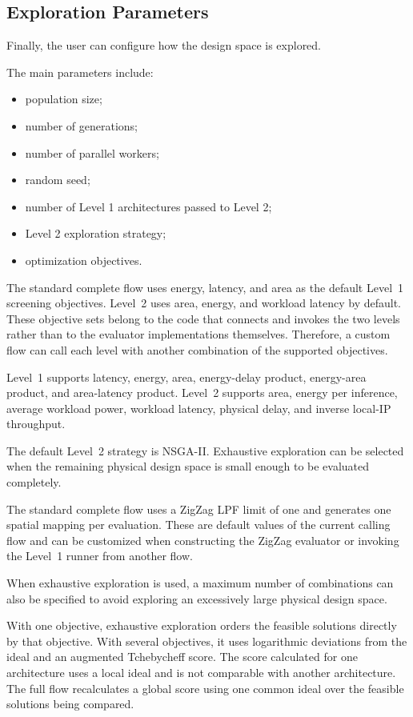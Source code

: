 \subsection{Exploration Parameters}

Finally, the user can configure how the design space is explored.

The main parameters include:

\begin{itemize}
    \item population size;
    \item number of generations;
    \item number of parallel workers;
    \item random seed;
    \item number of Level 1 architectures passed to Level 2;
    \item Level 2 exploration strategy;
    \item optimization objectives.
\end{itemize}

The standard complete flow uses energy, latency, and area as the
default Level~1 screening objectives. Level~2 uses area, energy, and
workload latency by default. These objective sets belong to the code
that connects and invokes the two levels rather than to the evaluator
implementations themselves. Therefore, a custom flow can call each
level with another combination of the supported objectives.

Level~1 supports latency, energy, area, energy-delay product,
energy-area product, and area-latency product. Level~2 supports area,
energy per inference, average workload power, workload latency,
physical delay, and inverse local-IP throughput.

The default Level~2 strategy is NSGA-II. Exhaustive exploration can be
selected when the remaining physical design space is small enough to
be evaluated completely.

The standard complete flow uses a ZigZag LPF limit of one and
generates one spatial mapping per evaluation. These are default values
of the current calling flow and can be customized when constructing
the ZigZag evaluator or invoking the Level~1 runner from another flow.

When exhaustive exploration is used, a maximum number of combinations
can also be specified to avoid exploring an excessively large physical
design space.

With one objective, exhaustive exploration orders the feasible
solutions directly by that objective. With several objectives, it uses
logarithmic deviations from the ideal and an augmented Tchebycheff
score. The score calculated for one architecture uses a local ideal
and is not comparable with another architecture. The full flow
recalculates a global score using one common ideal over the feasible
solutions being compared.


